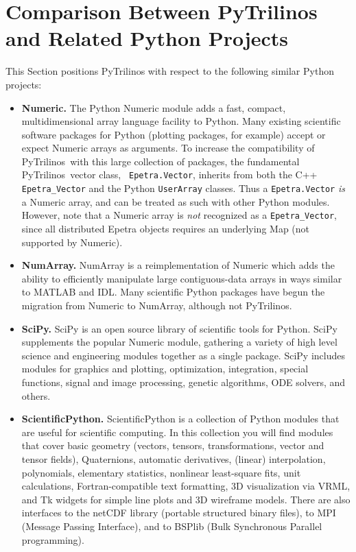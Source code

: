 \documentclass[acmtocl]{acmtrans2m}
\newcommand{\PyTrilinos}{{PyTrilinos}}
\begin{document}
\section{Comparison Between PyTrilinos and Related Python Projects}
\label{sec:comparison_python}

This Section positions PyTrilinos with respect to the following similar
Python projects:

\begin{itemize}

\item {\bf Numeric.} The Python Numeric module adds a fast, compact,
  multidimensional array language facility to Python.  Many existing
  scientific software packages for Python (plotting packages, for
  example) accept or expect Numeric arrays as arguments.  To increase
  the compatibility of \PyTrilinos\ with this large collection of
  packages, the fundamental \PyTrilinos\ vector class, {\tt
    Epetra.Vector}, inherits from both the C++ {\tt Epetra\_Vector}
  and the Python {\tt UserArray} classes.  Thus a {\tt Epetra.Vector}
  {\sl is} a Numeric array, and can be treated as such with other
  Python modules.  However, note that a Numeric array is {\sl not}
  recognized as a {\tt Epetra\_Vector}, since all distributed Epetra
  objects requires an underlying Map (not supported by Numeric).

\item {\bf NumArray.}  NumArray is a reimplementation of Numeric which
  adds the ability to efficiently manipulate large contiguous-data
  arrays in ways similar to MATLAB and IDL.  Many scientific Python
  packages have begun the migration from Numeric to NumArray, although
  not \PyTrilinos.

\item {\bf SciPy.} SciPy is an open source library of scientific tools
  for Python. SciPy supplements the popular Numeric module, gathering
  a variety of high level science and engineering modules together as
  a single package. SciPy includes modules for graphics and plotting,
  optimization, integration, special functions, signal and image
  processing, genetic algorithms, ODE solvers, and others.

\item {\bf ScientificPython.}  ScientificPython is a collection of
  Python modules that are useful for scientific computing. In this
  collection you will find modules that cover basic geometry (vectors,
  tensors, transformations, vector and tensor fields), Quaternions,
  automatic derivatives, (linear) interpolation, polynomials,
  elementary statistics, nonlinear least-square fits, unit
  calculations, Fortran-compatible text formatting, 3D visualization
  via VRML, and Tk widgets for simple line plots and 3D wireframe
  models. There are also interfaces to the netCDF library (portable
  structured binary files), to MPI (Message Passing Interface), and to
  BSPlib (Bulk Synchronous Parallel programming).


\end{itemize}
\end{document}
